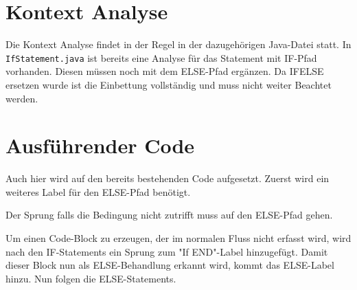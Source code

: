 \section{Kontext Analyse}
Die Kontext Analyse findet in der Regel in der dazugehörigen Java-Datei statt.
In \verb|IfStatement.java| ist bereits eine Analyse für das Statement mit IF-Pfad vorhanden. Diesen müssen noch mit dem ELSE-Pfad ergänzen. Da IFELSE ersetzen wurde ist die Einbettung vollständig und muss nicht weiter Beachtet werden.


\section{Ausführender Code}
Auch hier wird auf den bereits bestehenden Code aufgesetzt.
Zuerst wird ein weiteres Label für den ELSE-Pfad benötigt.

Der Sprung falls die Bedingung nicht zutrifft muss auf den ELSE-Pfad gehen.

Um einen Code-Block zu erzeugen, der im normalen Fluss nicht erfasst wird, wird nach den IF-Statements ein Sprung zum "If END"-Label hinzugefügt. Damit dieser Block nun als ELSE-Behandlung erkannt wird, kommt das ELSE-Label hinzu.
Nun folgen die ELSE-Statements.
